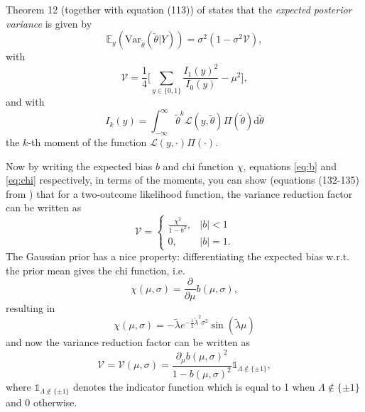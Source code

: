 \documentclass[]{report}
\begin{document}
Theorem 12 (together with equation (113)) of \cite{Koh2020} states that the \textit{expected posterior variance} is given by
\begin{equation}
    \mathbb{E}_y(\text{Var}_{\tilde{\theta}}(\tilde{\theta} | Y)) = \sigma^2(1-\sigma^2\mathcal{V}),
\end{equation}
with
\begin{equation}
    \mathcal{V} = \frac{1}{4}\Bigg[ \sum_{y\in \{0,1\}}\frac{I_1(y)^2}{I_0(y)} - \mu^2\Bigg],
\end{equation}
and with
\begin{equation}
    I_k(y) = \int_{-\infty}^{\infty} \tilde{\theta}^k \mathcal{L}(y, \tilde{\theta})\Pi(\tilde{\theta}) \text{d}\tilde{\theta}
\end{equation}
the $k$-th moment of the function $\mathcal{L}(y, \cdot)\Pi(\cdot)$.

Now by writing the expected bias $b$ and chi function $\chi$, equations \eqref{eq:b} and \eqref{eq:chi} respectively, in terms of the moments, you can show (equations (132-135) from \cite{Koh2020}) that for a two-outcome likelihood function, the variance reduction factor can be written as
\begin{equation}
    \mathcal{V} = \begin{cases}
        \frac{\chi^2}{1-b^2},   & |b|<1\\
        0,                      & |b|=1.
    \end{cases}
\end{equation}
The Gaussian prior has a nice property: differentiating the expected bias w.r.t. the prior mean gives the chi function, i.e.
\begin{equation}
\label{eq:chi-diff}
    \chi(\mu, \sigma) = \frac{\partial}{\partial\mu}b(\mu, \sigma),
\end{equation}
resulting in
\begin{equation}
\label{eq:chi-gaussian}
    \chi(\mu, \sigma) = - \tilde{\lambda} e^{-\frac{1}{2}\tilde{\lambda}^2\sigma^2}\sin(\tilde{\lambda}\mu)
\end{equation}
and now the variance reduction factor can be written as
\begin{equation}
    \mathcal{V} = \mathcal{V}(\mu, \sigma) = \frac{\partial_{\mu}b(\mu, \sigma)^2}{1 - b(\mu, \sigma)^2} \mathbb{1}_{\Lambda \notin \{\pm1\}},
\end{equation}
where $\mathbb{1}_{\Lambda \notin \{\pm1\}}$ denotes the indicator function which is equal to 1 when $\Lambda \notin \{\pm1\}$ and $0$ otherwise.
\end{document}
